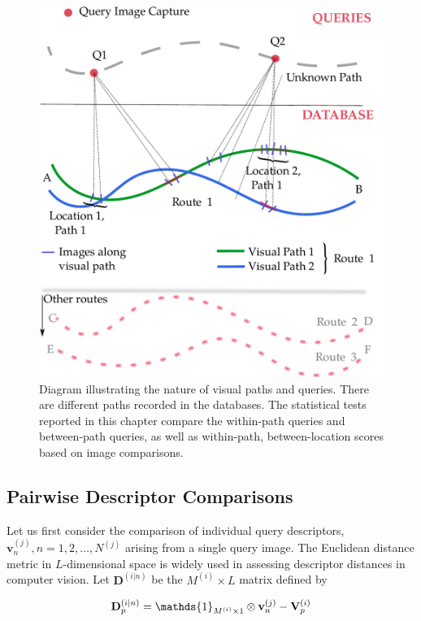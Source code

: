 \begin{figure}
\centering
\includegraphics[width=\linewidth]{./gfx/Chapter02/pathexample.pdf}
\caption{Diagram illustrating the nature of visual paths and queries.  There are different paths recorded in the databases. The statistical tests reported in this chapter compare the within-path queries and between-path queries, as well as within-path, between-location scores based on image comparisons.}
\label{fig:pathexample}
\end{figure}


\subsection{Pairwise Descriptor Comparisons} \label{subsec:pairwise}

Let us first consider the comparison of individual query descriptors, $\mathbf{v}_n^{(j)}, n=1,2,\ldots,N^{(j)}$ arising from a single query image.  The Euclidean distance metric in $L$-dimensional space is widely used in assessing descriptor distances in computer vision.  Let $\mathbf{D}^{(i|n)}$ be the $M^{(i)}\times L$ matrix defined by

\begin{equation}
\centering
\mathbf{D}^{(i|n)}_p =  \mathds{1}_{M^{(i)}\times 1} \otimes \mathbf{v}_n^{(j)} - \mathbf{V}^{(i)}_p
\end{equation}

